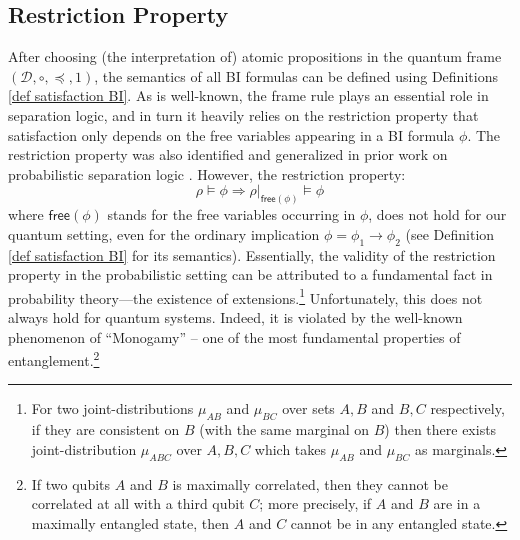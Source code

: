\documentclass[conference,compsoc, 10pt]{IEEEtran}
\newcommand{\jh}[1]{\textit{\color{red}[JH] : #1}}
\newcommand{\lz}[1]{\textit{\color{blue}[LZ] : #1}}
\newtheorem{example}{Example}[section]
\newcommand {\cD } {{\mathcal{D}}}
\newcommand {\free }[1] {{\mathsf{free}\left(#1\right)}}
\newcommand {\rt }[2] {{\left.{#1}\right|_{#2}}}
\def\>{\ensuremath{\rangle}}
\def\<{\ensuremath{\langle}}
\begin{document}
	\subsection{Restriction Property}
	\label{sec res}
	After choosing (the interpretation of) atomic propositions in the quantum
  frame $(\cD,\circ,\preceq,1)$, the semantics of all BI formulas can be defined
  using Definitions \ref{def satisfaction BI}. As is well-known, the frame rule 
  plays an essential role in separation logic, and in turn it heavily relies on
  the restriction property that satisfaction only depends on the free variables
  appearing in a BI formula $\phi$. The restriction property was also identified and
  generalized in prior work on probabilistic separation logic \cite{BHL19}.
	However, the restriction property: $$\rho\models\phi\Rightarrow
  \rt{\rho}{\free{\phi}}\models\phi$$ where $\free{\phi}$ stands for the free
  variables occurring in $\phi$, does not hold for our quantum setting, even for
  the ordinary implication $\phi=\phi_1\rightarrow\phi_2$ (see Definition
  \ref{def satisfaction BI} for its semantics). Essentially, the validity of the
  restriction property in the probabilistic setting can be attributed to a
  fundamental fact in probability theory---the existence of
  extensions.\footnote{For two joint-distributions $\mu_{AB}$ and $\mu_{BC}$
  over sets $A,B$ and $B,C$ respectively, if they are consistent on $B$ (with
the same marginal on $B$) then there exists joint-distribution $\mu_{ABC}$ over
$A,B,C$ which takes $\mu_{AB}$ and $\mu_{BC}$ as marginals.}
  Unfortunately, this does not always hold for quantum systems. Indeed, it is violated by the well-known phenomenon of  
  ``Monogamy'' --  one of the most fundamental properties of
  entanglement.\footnote{If two qubits $A$ and $B$ is maximally correlated, then they
  cannot be correlated at all with a third qubit $C$; more precisely, if $A$ and $B$ are in a maximally entangled state, then $A$ and $C$ cannot be in any entangled state.}
\end{document}
